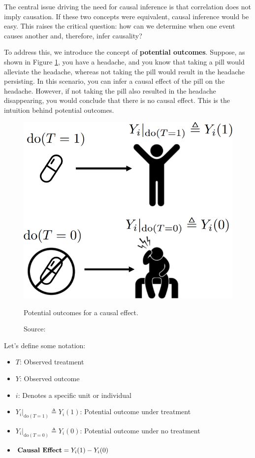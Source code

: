 The central issue driving the need for causal inference is that
correlation does not imply causation. If these two concepts were equivalent,
causal inference would be easy.
This raises the critical question: how can we determine when one
event causes another and, therefore, infer causality?

To address this, we introduce the concept of \textbf{potential outcomes}.
Suppose, as shown in Figure \ref{fig:potential_outcomes},
you have a headache, and you know that taking a pill would alleviate
the headache, whereas not taking the pill would result in the
headache persisting. In this scenario, you can infer a causal effect
of the pill on the headache. However, if not taking the pill
also resulted in the headache disappearing, you would conclude
that there is no causal effect.
This is the intuition behind potential outcomes.

\begin{figure}[h]
    \centering
    \includegraphics[width=.75\textwidth]{figures/ch3/11.potential.png}
    \caption{Potential outcomes for a causal effect.}
    \vspace{-10px}
    \caption*{\scriptsize{Source: \cite{Neal_2020a}}}
    \label{fig:potential_outcomes}
\end{figure}

Let's define some notation:
\begin{itemize}
    \item \( T \): Observed treatment
    \item \( Y \): Observed outcome
    \item \( i \): Denotes a specific unit or individual
    \item \( Y_i|_{\text{do}(T=1)} \triangleq Y_i(1) \): Potential outcome under treatment
    \item \( Y_i|_{\text{do}(T=0)} \triangleq Y_i(0) \): Potential outcome under no treatment
    \item \( \text{\textbf{Causal Effect}} = Y_i(1) - Y_i(0) \)
\end{itemize}


